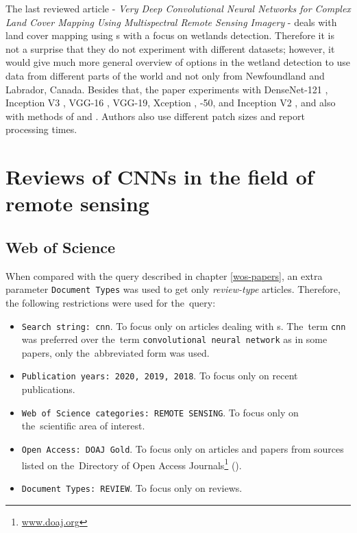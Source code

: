The last reviewed article - \textit{Very Deep Convolutional Neural Networks for Complex Land Cover Mapping Using Multispectral Remote Sensing Imagery} - deals with land cover mapping using s with a focus on wetlands detection. Therefore it is not a surprise that they do not experiment with different datasets; however, it would give much more general overview of  options in the wetland detection to use data from different parts of the world and not only from Newfoundland and Labrador, Canada. Besides that, the paper experiments with DenseNet-121 \cite{densenet}, Inception V3 \cite{inception}, VGG-16 \cite{vgg}, VGG-19, Xception \cite{xception}, -50, and Inception  V2 \cite{inception-resnet}, and also with  methods of  and . Authors also use different patch sizes and report processing times.

\section{Reviews of CNNs in the field of remote sensing}
\label{situation}

\subsection{Web of Science}
\label{wos-reviews}

When compared with the query described in chapter \ref{wos-papers}, an extra parameter \verb|Document Types| was used to get only \textit{review-type} articles. Therefore, the following restrictions were used for the~query:

\begin{itemize}
	\item \verb|Search string: cnn|. To focus only on articles dealing with s. The~term \verb|cnn| was preferred over the~term \verb|convolutional neural network| as in some papers, only the~abbreviated form was used.
	\item \verb|Publication years: 2020, 2019, 2018|. To focus only on recent publications.
	\item \verb|Web of Science categories: REMOTE SENSING|. To focus only on the~scien\-ti\-fic area of interest.
	\item \verb|Open Access: DOAJ Gold|. To focus only on articles and papers from sources listed on the~Di\-rectory of Open Access Journals\footnote{\url{www.doaj.org}} ().
	\item \verb|Document Types: REVIEW|. To focus only on reviews.
\end{itemize}

